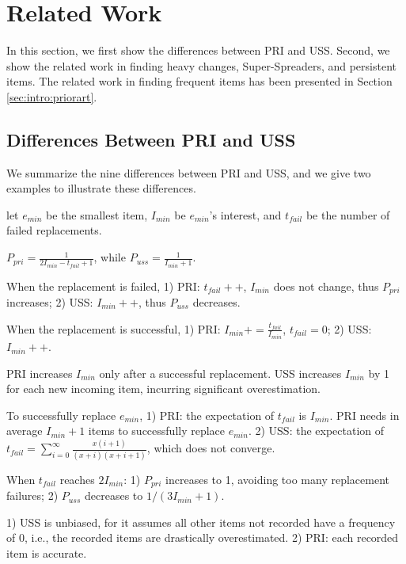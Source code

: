 \presec
\section{Related Work} \postsec
\label{sec:relatedwork}

In this section, we first show the differences between PRI and USS. Second, we show the related work in finding heavy changes, Super-Spreaders, and persistent items. The related work in finding frequent items has been presented in Section \ref{sec:intro:priorart}.

{\color{reviewC}
\subsection{Differences Between PRI and USS}

We summarize the nine differences between PRI and USS, and we give two examples to illustrate these differences.

 let $e_{min}$ be the smallest item, $I_{min}$ be $e_{min}$'s interest, and $t_{fail}$ be the number of failed replacements.

 $P_{pri} = \frac{1}{2I_{min} - t_{fail}+1}$, while 
$P_{uss} = \frac{1}{I_{min}+1}$.

 When the replacement is failed, 1) PRI: $t_{fail}++$, $I_{min}$ does not change, thus $P_{pri}$ increases; 2) USS: $I_{min}++$, thus $P_{uss}$ decreases. 

 When the replacement is successful, 1) PRI: $I_{min} += \frac{t_{fail}}{I_{min}}$, $t_{fail}=0$; 2) USS: $I_{min} ++$. 

 PRI increases $I_{min}$ only after a successful replacement. USS increases $I_{min}$ by 1 for each new incoming item, incurring significant overestimation. 


 To successfully replace $e_{min}$, 
1) PRI: the expectation of $t_{fail}$ is $I_{min}$. PRI needs in average $I_{min}+1$ items to successfully replace $e_{min}$. 2) USS: the expectation of $t_{fail}=\sum_{i=0}^{\infty}\frac{x(i+1)}{(x+i)(x+i+1)}$, which does not converge. 


 When $t_{fail}$ reaches $2I_{min}$: 1) $P_{pri}$ increases to 1, avoiding too many replacement failures; 2) $P_{uss}$ decreases to $1/(3I_{min}+1)$. 


 1) USS is unbiased, for it assumes all other items not recorded have a frequency of 0, i.e., the recorded items are drastically overestimated. 2) PRI: each recorded item is accurate. 

}
